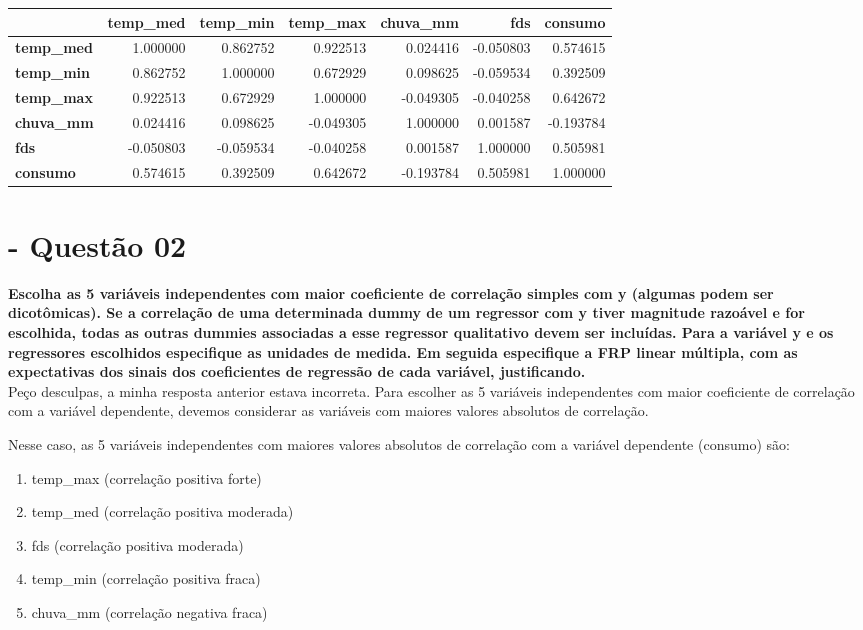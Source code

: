 \documentclass[a4paper, 12pt]{article}
\begin{document}
\begin{tabular}{lrrrrrr}
\toprule
{} &  \textbf{temp\_med} &  \textbf{temp\_min} &  \textbf{temp\_max} &  \textbf{chuva\_mm} &       \textbf{fds} &   \textbf{consumo} \\
\midrule
\textbf{temp\_med} &  1.000000 &  0.862752 &  0.922513 &  0.024416 & -0.050803 &  0.574615 \\
\textbf{temp\_min} &  0.862752 &  1.000000 &  0.672929 &  0.098625 & -0.059534 &  0.392509 \\
\textbf{temp\_max} &  0.922513 &  0.672929 &  1.000000 & -0.049305 & -0.040258 &  0.642672 \\
\textbf{chuva\_mm} &  0.024416 &  0.098625 & -0.049305 &  1.000000 &  0.001587 & -0.193784 \\
\textbf{fds}      & -0.050803 & -0.059534 & -0.040258 &  0.001587 &  1.000000 &  0.505981 \\
\textbf{consumo}  &  0.574615 &  0.392509 &  0.642672 & -0.193784 &  0.505981 &  1.000000 \\
\bottomrule
\end{tabular}


\section{- Questão 02}
\textbf{Escolha as 5 variáveis independentes com maior coeficiente de correlação simples com y (algumas podem ser dicotômicas). Se a correlação de uma determinada dummy de um regressor com y tiver magnitude razoável e for escolhida, todas as outras dummies associadas a esse regressor qualitativo devem ser incluídas. Para a variável y e os regressores escolhidos especifique as unidades de medida. Em seguida especifique a FRP linear múltipla, com as expectativas dos sinais dos coeficientes de regressão de cada variável,
justificando. } \\


Peço desculpas, a minha resposta anterior estava incorreta. Para escolher as 5 variáveis independentes com maior coeficiente de correlação com a variável dependente, devemos considerar as variáveis com maiores valores absolutos de correlação.

Nesse caso, as 5 variáveis independentes com maiores valores absolutos de correlação com a variável dependente (consumo) são:

\begin{enumerate}
    \item temp\_max (correlação positiva forte)
    \item temp\_med (correlação positiva moderada)
    \item fds (correlação positiva moderada)
    \item temp\_min (correlação positiva fraca)
    \item chuva\_mm (correlação negativa fraca)
\end{enumerate}
\end{document}

